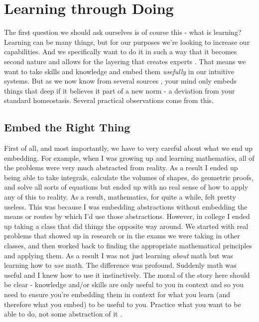 \documentclass[11pt,a5paper]{book}
\begin{document}
\section{Learning through Doing}
The first question we should ask ourselves is of course this - what is learning? Learning can be many things, but for our purposes we're looking to increase our capabilities. And we specifically want to do it in such a way that it becomes second nature and allows for the layering that creates experts \cite{ericsson}. That means we want to take skills and knowledge and embed them \textit{usefully} in our intuitive systems. But as we now know from several sources \cite{duhigg} \cite{ericsson}, your mind only embeds things that deep if it believes it part of a new norm - a deviation from your standard homeostasis. Several practical observations come from this.
\newline

\subsection{Embed the Right Thing}

First of all, and most importantly, we have to very careful about what we end up embedding. For example, when I was growing up and learning mathematics, all of the problems were very much abstracted from reality. As a result I ended up being able to take integrals, calculate the volumes of shapes, do geometric proofs, and solve all sorts of equations but ended up with no real sense of how to apply any of this to reality. As a result, mathematics, for quite a while, felt pretty useless. This was because I was embedding abstractions without embedding the means or routes by which I'd use those abstractions. However, in college I ended up taking a class that did things the opposite way around. We started with real problems that showed up in research or in the exams we were taking in other classes, and then worked back to finding the appropriate mathematical principles and applying them. As a result I was not just learning \textit{about} math but was learning how to \textit{use} math. The difference was profound. Suddenly math was useful and I knew how to use it instinctively. The moral of the story here should be clear - knowledge and/or skills are only useful to you in context and so you need to ensure you're embedding them in context for what you learn (and therefore what you embed) to be useful to you. Practice what you want to be able to do, not some abstraction of it \cite{stick}.
\newline
\end{document}

